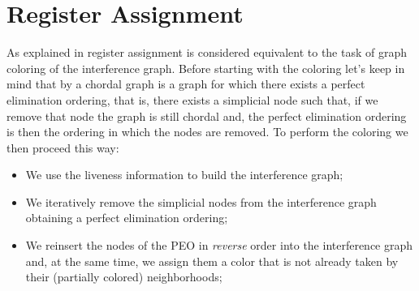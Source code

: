 



\section{Register Assignment}
\label{sec:ra}

As explained in  register assignment is considered equivalent to the task of graph coloring of the interference graph.
Before starting with the coloring let's keep in mind that by  a chordal graph is a graph for which there exists a perfect elimination ordering, that is, there exists a simplicial node such that, if we remove that node the graph is still chordal and, the perfect elimination ordering is then the ordering in which the nodes are removed.
To perform the coloring we then proceed this way:
\begin{itemize}
  \item We use the liveness information to build the interference graph;
  \item We iteratively remove the simplicial nodes from the interference graph obtaining a perfect elimination ordering;
  \item We reinsert the nodes of the PEO in \textit{reverse} order into the interference graph and, at the same time, we assign them a color that is not already taken by their (partially colored) neighborhoods;
\end{itemize}

